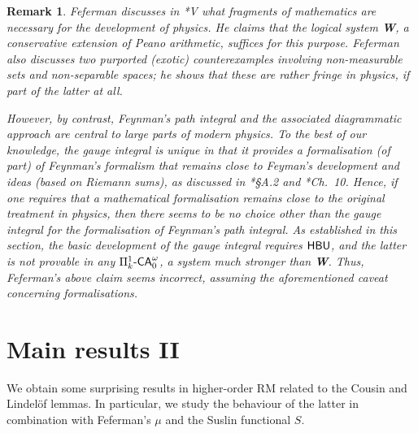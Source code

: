 \documentclass[reqno]{amsart}
\newtheorem{rem}[thm]{Remark}
\def\SIXK{\Pi_{k}^{1}\text{-\textsf{\textup{CA}}}_{0}^{\omega}}
\def\HBU{\textup{\textsf{HBU}}}
\numberwithin{equation}{section}
\numberwithin{thm}{section}
\begin{document}
\begin{rem}\label{fefferketoch}\rm 
Feferman discusses in \cite{fefermanlight}*{V} what fragments of mathematics are necessary for the development of physics. 
He claims that the logical system \textbf{W}, a conservative extension of Peano arithmetic, suffices for this purpose.   
Feferman also discusses two purported (exotic) counterexamples involving non-measurable sets and non-separable spaces; he shows that these are rather fringe in physics, if part of the latter at all.  

\smallskip

However, by contrast, Feynman's path integral and the associated diagrammatic approach are central to large parts of modern physics.   To the best of our knowledge, 
the gauge integral is unique in that it provides a formalisation (of part) of Feynman's formalism that remains close to Feyman's development and ideas (based on Riemann sums), as discussed in \cite{mully}*{\S A.2} and \cite{burkdegardener}*{Ch.\ 10}.  Hence, \emph{if} one requires that a mathematical formalisation remains close to the original treatment in physics, \emph{then} there seems to be no choice other than the      
gauge integral for the formalisation of Feynman's path integral.  As established in this section, the basic development of the gauge integral requires $\HBU$, and the latter is not provable in any $\SIXK$, a system much stronger than \textbf{W}.  Thus, Feferman's above claim seems incorrect, \emph{assuming} the aforementioned caveat concerning formalisations.    
\end{rem}

\section{Main results II}\label{RMR}
We obtain some surprising results in higher-order RM related to the Cousin and Lindel\"of lemmas.  In particular, we study the behaviour of the latter
in combination with Feferman's $\mu$ and the Suslin functional $S$.    
\end{document}
